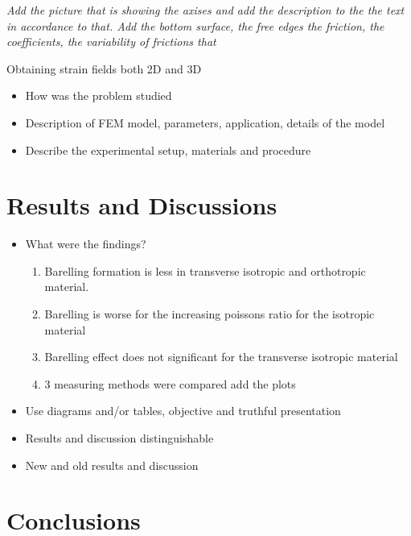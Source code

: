 \documentclass[review]{elsarticle}
\begin{document}
\textit{\color {red}Add the picture that is showing the axises and add the
description to the the text in accordance to that. Add the bottom surface, the
free edges the friction, the coefficients, the variability of frictions that }

\begin{description}
\item[{\color {red}Obtaining strain fields both 2D and 3D}]
\end{description}

\begin{itemize}
\color{red}
\item How was the problem studied 
\item Description of FEM model, parameters, application, details of the model
\item Describe the experimental setup, materials and procedure
\end{itemize}


\section{Results and Discussions}
\begin{itemize}
\color{red}
\item What were the findings?

	\begin{enumerate}
	\color{black}
		\item Barelling formation is less in transverse isotropic and orthotropic
		material.
		\item Barelling is worse for the increasing poissons ratio for the isotropic
		material
		\item Barelling effect does not significant for the transverse isotropic
		material
		\item 3 measuring methods were compared {\color{red} add the plots}
	\end{enumerate}



\item Use diagrams and/or tables, objective and truthful presentation
\item Results and discussion distinguishable
\item New and old results and discussion
\end{itemize}


\section{Conclusions}
\end{document}
